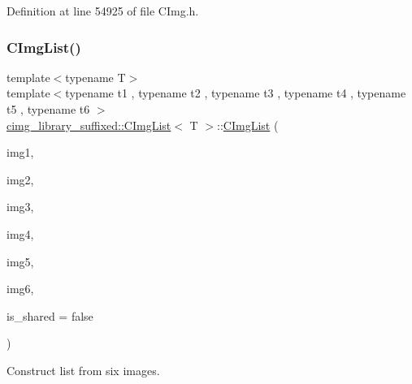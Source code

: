 Definition at line 54925 of file C\+Img.\+h.

\mbox{\label{structcimg__library__suffixed_1_1CImgList_a6b020295d1a0b79fa24700733ba7bbc9}} 
\subsubsection{\texorpdfstring{C\+Img\+List()}{CImgList()}\hspace{0.1cm}{\footnotesize\ttfamily [13/19]}}
{\footnotesize\ttfamily template$<$typename T$>$ \\
template$<$typename t1 , typename t2 , typename t3 , typename t4 , typename t5 , typename t6 $>$ \\
\hyperlink{structcimg__library__suffixed_1_1CImgList}{cimg\+\_\+library\+\_\+suffixed\+::\+C\+Img\+List}$<$ T $>$\+::\hyperlink{structcimg__library__suffixed_1_1CImgList}{C\+Img\+List} (\begin{DoxyParamCaption}\item[{const \hyperlink{structcimg__library__suffixed_1_1CImg}{C\+Img}$<$ t1 $>$ \&}]{img1,  }\item[{const \hyperlink{structcimg__library__suffixed_1_1CImg}{C\+Img}$<$ t2 $>$ \&}]{img2,  }\item[{const \hyperlink{structcimg__library__suffixed_1_1CImg}{C\+Img}$<$ t3 $>$ \&}]{img3,  }\item[{const \hyperlink{structcimg__library__suffixed_1_1CImg}{C\+Img}$<$ t4 $>$ \&}]{img4,  }\item[{const \hyperlink{structcimg__library__suffixed_1_1CImg}{C\+Img}$<$ t5 $>$ \&}]{img5,  }\item[{const \hyperlink{structcimg__library__suffixed_1_1CImg}{C\+Img}$<$ t6 $>$ \&}]{img6,  }\item[{const bool}]{is\+\_\+shared = {\ttfamily false} }\end{DoxyParamCaption})\hspace{0.3cm}{\ttfamily [inline]}}



Construct list from six images. 



